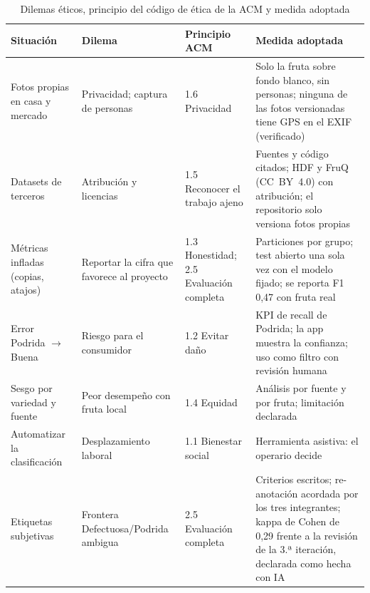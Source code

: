 \documentclass[conference,a4paper]{IEEEtran}
\begin{document}
\begin{table}[t]
\caption{Dilemas éticos, principio del código de ética de la ACM y medida adoptada}
\label{tab:etica}
\centering\footnotesize
\begin{tabular}{@{}p{3.2cm}p{3.4cm}p{2.6cm}p{7.2cm}@{}}
\toprule
Situación & Dilema & Principio ACM & Medida adoptada \\
\midrule
Fotos propias en casa y mercado & Privacidad; captura de personas & 1.6 Privacidad & Solo la fruta sobre fondo blanco, sin personas; ninguna de las fotos versionadas tiene GPS en el EXIF (verificado) \\
Datasets de terceros & Atribución y licencias & 1.5 Reconocer el trabajo ajeno & Fuentes y código citados; HDF y FruQ (CC~BY~4.0) con atribución; el repositorio solo versiona fotos propias \\
Métricas infladas (copias, atajos) & Reportar la cifra que favorece al proyecto & 1.3 Honestidad; 2.5 Evaluación completa & Particiones por grupo; test abierto una sola vez con el modelo fijado; se reporta F1 0,47 con fruta real \\
Error Podrida $\rightarrow$ Buena & Riesgo para el consumidor & 1.2 Evitar daño & KPI de recall de Podrida; la app muestra la confianza; uso como filtro con revisión humana \\
Sesgo por variedad y fuente & Peor desempeño con fruta local & 1.4 Equidad & Análisis por fuente y por fruta; limitación declarada \\
Automatizar la clasificación & Desplazamiento laboral & 1.1 Bienestar social & Herramienta asistiva: el operario decide \\
Etiquetas subjetivas & Frontera Defectuosa/Podrida ambigua & 2.5 Evaluación completa & Criterios escritos; re-anotación acordada por los tres integrantes; kappa de Cohen \cite{cohen1960} de 0,29 frente a la revisión de la 3.ª iteración, declarada como hecha con IA \\
\bottomrule
\end{tabular}
\end{table}
\end{document}
